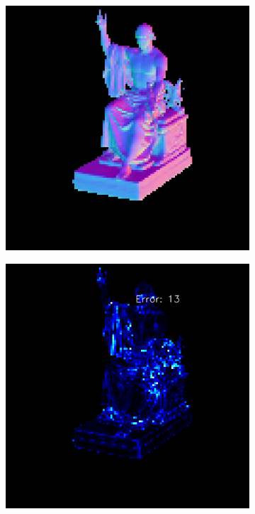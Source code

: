 \begin{figure}
\begin{subfigure}[b]{0.24\linewidth}
	\end{subfigure}
	\begin{subfigure}[b]{0.24\linewidth}
		\includegraphics[width=\linewidth]{./Figures/gcnn_synthetic/fancy_eval_3_normal_an2-8-1000.png}
	\end{subfigure}
	\begin{subfigure}[b]{0.24\linewidth}
		\includegraphics[width=\linewidth]{./Figures/gcnn_synthetic/fancy_eval_3_error_an2-8-1000.png}
	\end{subfigure}
	

\end{figure}
